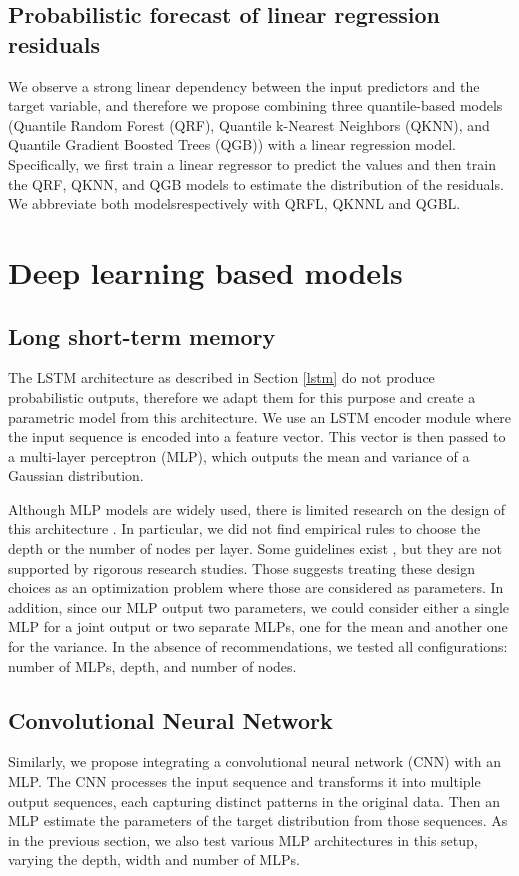 \documentclass[12pt,a4paper]{book}
\begin{document}
\subsection{Probabilistic forecast of linear regression residuals} 
We observe a strong linear dependency between the input predictors and the target variable, and therefore we propose combining three quantile-based models (Quantile Random Forest (QRF), Quantile k-Nearest Neighbors (QKNN), and Quantile Gradient Boosted Trees (QGB)) with a linear regression model. Specifically, we first train a linear regressor to predict the \no values and then train the QRF, QKNN, and QGB models to estimate the distribution of the residuals. We abbreviate both modelsrespectively with QRFL, QKNNL and QGBL.

\section{Deep learning based models} 

\subsection{Long short-term memory} 
The LSTM architecture as described in Section \ref{lstm} do not produce probabilistic outputs, therefore we adapt them for this purpose and create a parametric model from this architecture. We use an LSTM encoder module where the input sequence is encoded into a feature vector. This vector is then passed to a multi-layer perceptron (MLP), which outputs the mean and variance of a Gaussian distribution.  

Although MLP models are widely used, there is limited research on the design of this architecture \citep{ramchoun_multilayer_2016,castro_multilayer_2017}. In particular, we did not find empirical rules to choose the depth or the number of nodes per layer. Some guidelines exist \cite{doug_answer_2012}, but they are not supported by rigorous research studies. Those suggests treating these design choices as an optimization problem where those are considered as parameters. In addition, since our MLP output two parameters, we could consider either a single MLP for a joint output or two separate MLPs, one for the mean and another one for the variance. In the absence of recommendations, we tested all configurations: number of MLPs, depth, and number of nodes.

\subsection{Convolutional Neural Network} 
Similarly, we propose integrating a convolutional neural network (CNN) with an MLP. The CNN processes the input sequence and transforms it into multiple output sequences, each capturing distinct patterns in the original data. Then an MLP estimate the parameters of the target distribution from those sequences. As in the previous section, we also test various MLP architectures in this setup, varying the depth, width and number of MLPs.
\end{document}
